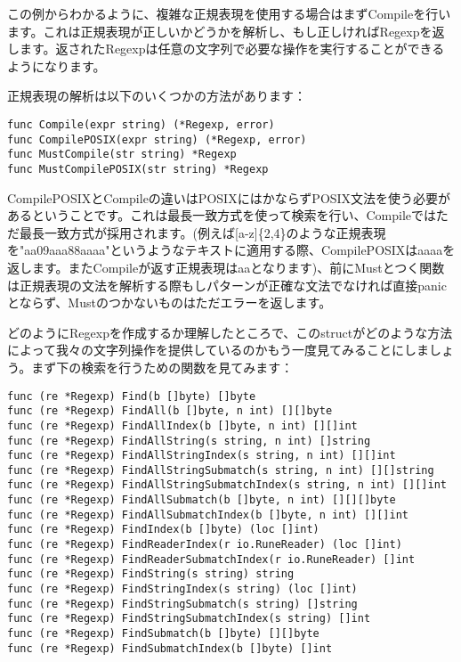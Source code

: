 この例からわかるように、複雑な正規表現を使用する場合はまずCompileを行います。これは正規表現が正しいかどうかを解析し、もし正しければRegexpを返します。返されたRegexpは任意の文字列で必要な操作を実行することができるようになります。

正規表現の解析は以下のいくつかの方法があります：

\begin{lstlisting}[numbers=none]
func Compile(expr string) (*Regexp, error)
func CompilePOSIX(expr string) (*Regexp, error)
func MustCompile(str string) *Regexp
func MustCompilePOSIX(str string) *Regexp
\end{lstlisting}

CompilePOSIXとCompileの違いはPOSIXにはかならずPOSIX文法を使う必要があるということです。これは最長一致方式を使って検索を行い、Compileではただ最長一致方式が採用されます。(例えば[a-z]\{2,4\}のような正規表現を"aa09aaa88aaaa"というようなテキストに適用する際、CompilePOSIXはaaaaを返します。またCompileが返す正規表現はaaとなります)、前にMustとつく関数は正規表現の文法を解析する際もしパターンが正確な文法でなければ直接panicとならず、Mustのつかないものはただエラーを返します。

どのようにRegexpを作成するか理解したところで、このstructがどのような方法によって我々の文字列操作を提供しているのかもう一度見てみることにしましょう。まず下の検索を行うための関数を見てみます：

\begin{lstlisting}[numbers=none]
func (re *Regexp) Find(b []byte) []byte
func (re *Regexp) FindAll(b []byte, n int) [][]byte
func (re *Regexp) FindAllIndex(b []byte, n int) [][]int
func (re *Regexp) FindAllString(s string, n int) []string
func (re *Regexp) FindAllStringIndex(s string, n int) [][]int
func (re *Regexp) FindAllStringSubmatch(s string, n int) [][]string
func (re *Regexp) FindAllStringSubmatchIndex(s string, n int) [][]int
func (re *Regexp) FindAllSubmatch(b []byte, n int) [][][]byte
func (re *Regexp) FindAllSubmatchIndex(b []byte, n int) [][]int
func (re *Regexp) FindIndex(b []byte) (loc []int)
func (re *Regexp) FindReaderIndex(r io.RuneReader) (loc []int)
func (re *Regexp) FindReaderSubmatchIndex(r io.RuneReader) []int
func (re *Regexp) FindString(s string) string
func (re *Regexp) FindStringIndex(s string) (loc []int)
func (re *Regexp) FindStringSubmatch(s string) []string
func (re *Regexp) FindStringSubmatchIndex(s string) []int
func (re *Regexp) FindSubmatch(b []byte) [][]byte
func (re *Regexp) FindSubmatchIndex(b []byte) []int
\end{lstlisting}

